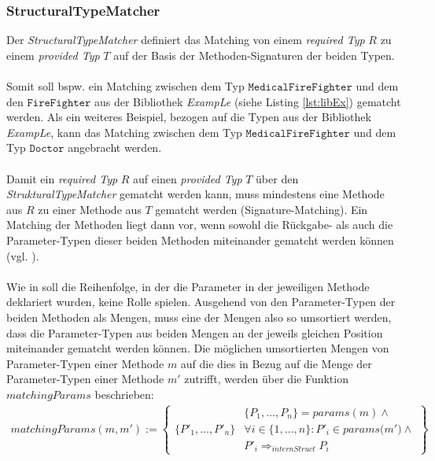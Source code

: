 \subsubsection{StructuralTypeMatcher} \label{subsec_structmatcher}
Der \emph{StructuralTypeMatcher} definiert das Matching von einem \emph{required Typ} $R$ zu einem \emph{provided Typ} $T$ auf der Basis der Methoden-Signaturen der beiden Typen.
\\\\
Somit soll bspw. ein Matching zwischen dem Typ $\texttt{MedicalFireFighter}$ und dem den $\texttt{FireFighter}$ aus der Bibliothek \emph{ExampLe}  (siehe Listing \ref{lst:libEx}) gematcht werden. Als ein weiteres Beispiel, bezogen auf die Typen aus der Bibliothek \emph{ExampLe}, kann das Matching zwischen dem Typ $\texttt{MedicalFireFighter}$ und dem Typ $\texttt{Doctor}$ angebracht werden.
\\\\
Damit ein \emph{required Typ} $R$ auf einen \emph{provided Typ} $T$ über den \emph{StrukturalTypeMatcher} gematcht werden kann, muss mindestens eine Methode aus $R$ zu einer Methode aus $T$ gematcht werden (Signature-Matching). Ein Matching der Methoden liegt dann vor, wenn sowohl die Rückgabe- als auch die Parameter-Typen dieser beiden Methoden miteinander gematcht werden können (vgl. \cite{moormann}). 
\\\\
Wie in \cite{moormann} soll die Reihenfolge, in der die Parameter in der jeweiligen Methode deklariert wurden, keine Rolle spielen. Ausgehend von den Parameter-Typen der beiden Methoden als Mengen, muss eine der Mengen also so umsortiert werden, dass die Parameter-Typen aus beiden Mengen an der jeweils gleichen Position miteinander gematcht werden können.
Die möglichen umsortierten Mengen von Parameter-Typen einer Methode $m$ auf die dies in Bezug auf die Menge der Parameter-Typen einer Methode $m'$ zutrifft, werden über die Funktion $\mathit{matchingParams}$ beschrieben:
\begin{gather*}
\mathit{matchingParams(m, m')} :=
\left\{
\begin{array}{l|l}
	&
	\{\mathit{P_1,...,P_n}\} = \mathit{params(m)} \wedge \mathit{ }
	\\
	\{\mathit{P'_1,...,P'_n}\}
	&
	\forall i \in \{1,...,n\}: \mathit{P'_i} \in \mathit{params(m'}) \wedge \mathit{ }
	\\
	&
	\mathit{P'_i} \Rightarrow_{internStruct} \mathit{P_i}
\end{array}
\right\}
\end{gather*}
